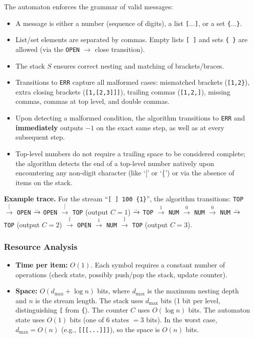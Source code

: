 \documentclass[11pt]{article}
\begin{document}
The automaton enforces the grammar of valid messages:
\begin{itemize}
\item A message is either a number (sequence of digits), a list \texttt{[$\ldots$]}, or a set \texttt{\{$\ldots$\}}.
\item List/set elements are separated by commas. Empty lists \texttt{[\,]} and sets \texttt{\{\,\}} are allowed (via the \texttt{OPEN} $\to$ close transition).
\item The stack $S$ ensures correct nesting and matching of brackets/braces.
\item Transitions to \texttt{ERR} capture all malformed cases: mismatched brackets (\texttt{[1,2\}}), extra closing brackets (\texttt{[1,[2,3]]]}), trailing commas (\texttt{[1,2,]}), missing commas, commas at top level, and double commas.
\item Upon detecting a malformed condition, the algorithm transitions to \texttt{ERR} and \textbf{immediately} outputs $-1$ on the exact same step, as well as at every subsequent step.
\item Top-level numbers do not require a trailing space to be considered complete; the algorithm detects the end of a top-level number natively upon encountering any non-digit character (like `[' or `\{') or via the absence of items on the stack.
\end{itemize}

\textbf{Example trace.} For the stream ``\texttt{[ ] 100 \{1\}}'', the algorithm transitions: \texttt{TOP} $\xrightarrow{[}$ \texttt{OPEN} $\xrightarrow{\text{\textvisiblespace}}$ \texttt{OPEN} $\xrightarrow{]}$ \texttt{TOP} (output $C\!=\!1$) $\xrightarrow{\text{\textvisiblespace}}$ \texttt{TOP} $\xrightarrow{1}$ \texttt{NUM} $\xrightarrow{0}$ \texttt{NUM} $\xrightarrow{0}$ \texttt{NUM} $\xrightarrow{\text{\textvisiblespace}}$ \texttt{TOP} (output $C\!=\!2$) $\xrightarrow{\{}$ \texttt{OPEN} $\xrightarrow{1}$ \texttt{NUM} $\xrightarrow{\}}$ \texttt{TOP} (output $C\!=\!3$).

\subsubsection*{Resource Analysis}

\begin{itemize}
\item \textbf{Time per item:} $O(1)$. Each symbol requires a constant number of operations (check state, possibly push/pop the stack, update counter).
\item \textbf{Space:} $O(d_{\max} + \log n)$ bits, where $d_{\max}$ is the maximum nesting depth and $n$ is the stream length. The stack uses $d_{\max}$ bits (1 bit per level, distinguishing \texttt{[} from \texttt{\{}). The counter $C$ uses $O(\log n)$ bits. The automaton state uses $O(1)$ bits (one of 6 states $= 3$ bits). In the worst case, $d_{\max} = O(n)$ (e.g., \texttt{[[[...]]]}), so the space is $O(n)$ bits.
\end{itemize}
\newpage
\end{document}
